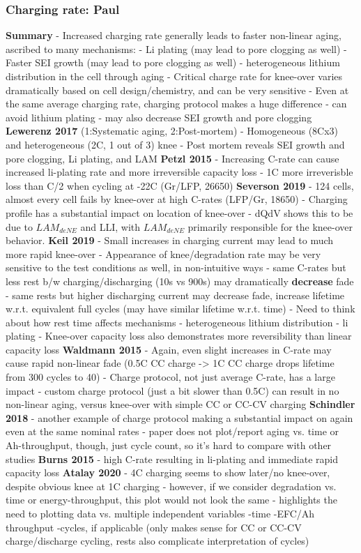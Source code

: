 \documentclass{article}
\begin{document}
\subsubsection{Charging rate: Paul}
\textbf{Summary}
- Increased charging rate generally leads to faster non-linear aging, ascribed to many mechanisms:
    - Li plating (may lead to pore clogging as well)
    - Faster SEI growth (may lead to pore clogging as well)
    - heterogeneous lithium distribution in the cell through aging
- Critical charge rate for knee-over varies dramatically based on cell design/chemistry, and can be very sensitive
- Even at the same average charging rate, charging protocol makes a huge difference
    - can avoid lithium plating
    - may also decrease SEI growth and pore clogging
\textbf{Lewerenz 2017} (1:Systematic aging, 2:Post-mortem)
- Homogeneous (8Cx3) and heterogeneous (2C, 1 out of 3) knee
- Post mortem reveals SEI growth and pore clogging, Li plating, and LAM
\textbf{Petzl 2015}
- Increasing C-rate can cause increased li-plating rate and more irreversible capacity loss
- 1C more irreverisble loss than C/2 when cycling at -22C (Gr/LFP, 26650)
\textbf{Severson 2019}
- 124 cells, almost every cell fails by knee-over at high C-rates (LFP/Gr, 18650)
- Charging profile has a substantial impact on location of knee-over
- dQdV shows this to be due to $LAM_{deNE}$ and LLI, with $LAM_{deNE}$ primarily responsible for the knee-over behavior.
\textbf{Keil 2019}
- Small increases in charging current may lead to much more rapid knee-over
- Appearance of knee/degradation rate may be very sensitive to the test conditions as well, in non-intuitive ways
    - same C-rates but less rest b/w charging/discharging (10s vs 900s) may dramatically \textbf{decrease} fade
    - same rests but higher discharging current may {decrease} fade, increase lifetime w.r.t. equivalent full cycles (may have similar lifetime w.r.t. time)
- Need to think about how rest time affects mechanisms
    - heterogeneous lithium distribution
    - li plating
- Knee-over capacity loss also demonstrates more reversibility than linear capacity loss
\textbf{Waldmann 2015}
- Again, even slight increases in C-rate may cause rapid non-linear fade (0.5C CC charge -> 1C CC charge drops lifetime from 300 cycles to 40)
- Charge protocol, not just average C-rate, has a large impact
    - custom charge protocol (just a bit slower than 0.5C) can result in no non-linear aging, versus knee-over with simple CC or CC-CV charging
\textbf{Schindler 2018}
- another example of charge protocol making a substantial impact on again even at the same nominal rates
    - paper does not plot/report aging vs. time or Ah-throughput, though, just cycle count, so it's hard to compare with other studies
\textbf{Burns 2015}
- high C-rate resulting in li-plating and immediate rapid capacity loss
\textbf{Atalay 2020}
- 4C charging seems to show later/no knee-over, despite obvious knee at 1C charging
- however, if we consider degradation vs. time or energy-throughput, this plot would not look the same
- highlights the need to plotting data vs. multiple independent variables
    -time
    -EFC/Ah throughput
    -cycles, if applicable (only makes sense for CC or CC-CV charge/discharge cycling, rests also complicate interpretation of cycles)
\end{document}
